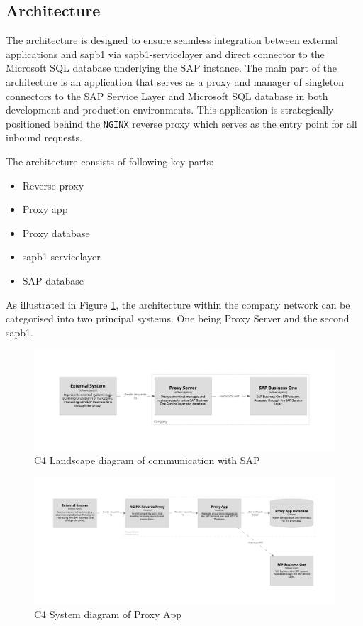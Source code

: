 \subsection{Architecture}
\label{subsec:architecture}
The architecture is designed to ensure seamless integration between external applications and \gls{sapb1} via \gls{sapb1-servicelayer} and direct connector to the Microsoft SQL database underlying the SAP instance. 
The main part of the architecture is an application that serves as a proxy and manager of singleton connectors to the SAP Service Layer and Microsoft SQL database in both development and production environments.
This application is strategically positioned behind the \texttt{NGINX} reverse proxy which serves as the entry point for all inbound requests.

The architecture consists of following key parts:
\begin{itemize}
    \item Reverse proxy
    \item Proxy app
    \item Proxy database
    \item \gls{sapb1-servicelayer}
    \item SAP database
\end{itemize}

As illustrated in Figure \ref{img07:structurizr:landscape}, the architecture within the company network can be categorised into two principal systems. One being Proxy Server and the second \gls{sapb1}.

\begin{figure}[H]\centering
\includegraphics[width=140mm]{img/chap07/fig_structurizr-landscape.png}
\caption{C4 Landscape diagram of communication with SAP}
\label{img07:structurizr:landscape}
\end{figure}

\begin{figure}[H]\centering
\includegraphics[width=140mm]{img/chap07/fig_structurizr-proxy-system.png}
\caption{C4 System diagram of Proxy App}
\label{img07:structurizr:system:proxy}
\end{figure}

